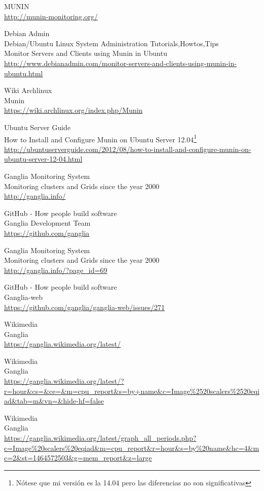 \begin{thebibliography}{10}
MUNIN\\
  \url{http://munin-monitoring.org/}

Debian Admin\\
Debian/Ubuntu Linux System Administration Tutorials,Howtos,Tips\\
Monitor Servers and Clients using Munin in Ubuntu\\
  \url{http://www.debianadmin.com/monitor-servers-and-clients-using-munin-in-ubuntu.html}

Wiki Archlinux\\
Munin\\
  \url{https://wiki.archlinux.org/index.php/Munin}

Ubuntu Server Guide\\
How to Install and Configure Munin on Ubuntu Server 12.04\footnote{Nótese que mi
versión es la 14.04 pero las diferencias no son significativas}\\
  \url{http://ubuntuserverguide.com/2012/08/how-to-install-and-configure-munin-on-ubuntu-server-12-04.html}


Ganglia Monitoring System\\
Monitoring clusters and Grids since the year 2000\\
  \url{http://ganglia.info/}

GitHub - How people build software\\
Ganglia Development Team\\
  \url{https://github.com/ganglia}

Ganglia Monitoring System\\
Monitoring clusters and Grids since the year 2000\\
  \url{http://ganglia.info/?page_id=69}

GitHub - How people build software\\
Ganglia-web\\
  \url{https://github.com/ganglia/ganglia-web/issues/271}

Wikimedia\\
Ganglia\\
  \url{https://ganglia.wikimedia.org/latest/}



Wikimedia\\
Ganglia\\
  \url{https://ganglia.wikimedia.org/latest/?r=hour&cs=&ce=&m=cpu_report&s=by+name&c=Image\%2520scalers\%2520eqiad&tab=m&vn=&hide-hf=false}

Wikimedia\\
Ganglia\\
  \url{https://ganglia.wikimedia.org/latest/graph_all_periods.php?c=Image\%20scalers\%20eqiad&m=cpu_report&r=hour&s=by\%20name&hc=4&mc=2&st=1464572503&g=mem_report&z=large}


\end{thebibliography}
